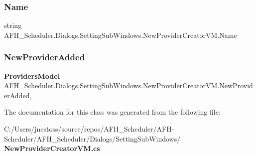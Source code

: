 \subsubsection{Name}
{\footnotesize\ttfamily string A\+F\+H\+\_\+\+Scheduler.\+Dialogs.\+Setting\+Sub\+Windows.\+New\+Provider\+Creator\+V\+M.\+Name\hspace{0.3cm}{\ttfamily [get]}}

\mbox{\label{class_a_f_h___scheduler_1_1_dialogs_1_1_setting_sub_windows_1_1_new_provider_creator_v_m_a4ae066f29d2a315d08840a0fae913f61}} 
\subsubsection{NewProviderAdded}
{\footnotesize\ttfamily \textbf{ Providers\+Model} A\+F\+H\+\_\+\+Scheduler.\+Dialogs.\+Setting\+Sub\+Windows.\+New\+Provider\+Creator\+V\+M.\+New\+Provider\+Added\hspace{0.3cm}{\ttfamily [get]}, {\ttfamily [set]}}



The documentation for this class was generated from the following file\+:\begin{DoxyCompactItemize}
\item 
C\+:/\+Users/jnestoss/source/repos/\+A\+F\+H\+\_\+\+Scheduler/\+A\+F\+H-\/\+Scheduler/\+A\+F\+H\+\_\+\+Scheduler/\+Dialogs/\+Setting\+Sub\+Windows/\textbf{ New\+Provider\+Creator\+V\+M.\+cs}\end{DoxyCompactItemize}
